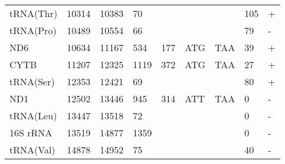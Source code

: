 \documentclass[../DISSERTACAO_MAIN.tex]{subfiles}
\begin{document}
\begin{longtable}{llllllllllllllllllllll}
			tRNA(Thr)    & 10314          & \multicolumn{2}{l}{10383} & \multicolumn{2}{l}{70}         & \multicolumn{3}{l}{}                          & \multicolumn{3}{l}{}              & \multicolumn{3}{l}{}      & \multicolumn{3}{l}{105}         & \multicolumn{4}{l}{+}                  \\
			tRNA(Pro)    & 10489          & \multicolumn{2}{l}{10554} & \multicolumn{2}{l}{66}         & \multicolumn{3}{l}{}                          & \multicolumn{3}{l}{}              & \multicolumn{3}{l}{}      & \multicolumn{3}{l}{79}          & \multicolumn{4}{l}{-}                  \\
			ND6          & 10634          & \multicolumn{2}{l}{11167} & \multicolumn{2}{l}{534}        & \multicolumn{3}{l}{177}                       & \multicolumn{3}{l}{ATG}           & \multicolumn{3}{l}{TAA}   & \multicolumn{3}{l}{39}          & \multicolumn{4}{l}{+}                  \\
			CYTB         & 11207          & \multicolumn{2}{l}{12325} & \multicolumn{2}{l}{1119}       & \multicolumn{3}{l}{372}                       & \multicolumn{3}{l}{ATG}           & \multicolumn{3}{l}{TAA}   & \multicolumn{3}{l}{27}          & \multicolumn{4}{l}{+}                  \\
			tRNA(Ser)    & 12353          & \multicolumn{2}{l}{12421} & \multicolumn{2}{l}{69}         & \multicolumn{3}{l}{}                          & \multicolumn{3}{l}{}              & \multicolumn{3}{l}{}      & \multicolumn{3}{l}{80}          & \multicolumn{4}{l}{+}                  \\
			ND1          & 12502          & \multicolumn{2}{l}{13446} & \multicolumn{2}{l}{945}        & \multicolumn{3}{l}{314}                       & \multicolumn{3}{l}{ATT}           & \multicolumn{3}{l}{TAA}   & \multicolumn{3}{l}{0}           & \multicolumn{4}{l}{-}                  \\
			tRNA(Leu)    & 13447          & \multicolumn{2}{l}{13518} & \multicolumn{2}{l}{72}         & \multicolumn{3}{l}{}                          & \multicolumn{3}{l}{}              & \multicolumn{3}{l}{}      & \multicolumn{3}{l}{0}           & \multicolumn{4}{l}{-}                  \\
			16S 				rRNA & 13519          & \multicolumn{2}{l}{14877} & \multicolumn{2}{l}{1359}       & \multicolumn{3}{l}{}                          & \multicolumn{3}{l}{}              & \multicolumn{3}{l}{}      & \multicolumn{3}{l}{0}           & \multicolumn{4}{l}{-}                  \\
			tRNA(Val)    & 14878          & \multicolumn{2}{l}{14952} & \multicolumn{2}{l}{75}         & \multicolumn{3}{l}{}                          & \multicolumn{3}{l}{}              & \multicolumn{3}{l}{}      & \multicolumn{3}{l}{40}          & \multicolumn{4}{l}{-}                  \\

\end{longtable}
\end{document}
